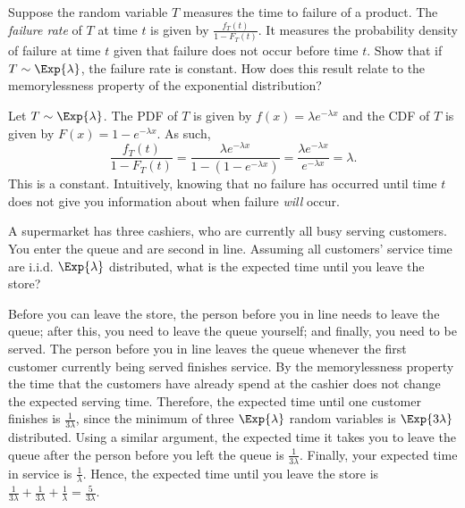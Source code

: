 	\begin{exercise}
		Suppose the random variable $T$ measures the time to failure of a product. The \emph{failure rate} of $T$ at time $t$ is given by $\frac{f_T(t)}{1 - F_T(t)}$. It measures the probability density of failure at time $t$ given that failure does not occur before time $t$. Show that if $T \sim \Exp{\lambda}$, the failure rate is constant. How does this result relate to the memorylessness property of the exponential distribution?
		\begin{solution}
			Let $T \sim \Exp{\lambda}$. The PDF of $T$ is given by $f(x) = \lambda e^{- \lambda x}$ and the CDF of $T$ is given by $F(x) = 1 - e^{- \lambda x}$. As such,
			\begin{equation*}
				\frac{f_T(t)}{1 - F_T(t)} = \frac{\lambda e^{- \lambda x}}{1 - (1 - e^{- \lambda x})} = \frac{\lambda e^{- \lambda x}}{e^{- \lambda x}} = \lambda.
			\end{equation*}
			This is a constant. Intuitively, knowing that no failure has occurred until time $t$ does not give you information about when failure \emph{will} occur.
		\end{solution}
	\end{exercise}
	
	\begin{exercise}
		A supermarket has three cashiers, who are currently all busy serving customers. You enter the queue and are second in line. Assuming all customers' service time are i.i.d. $\Exp{\lambda}$ distributed, what is the expected time until you leave the store?
		\begin{solution}
			Before you can leave the store, the person before you in line needs to leave the queue; after this, you need to leave the queue yourself; and finally, you need to be served. The person before you in line leaves the queue whenever the first customer currently being served finishes service. By the memorylessness property the time that the customers have already spend at the cashier does not change the expected serving time. Therefore, the expected time until one customer finishes is $\frac{1}{3 \lambda}$, since the minimum of three $\Exp{\lambda}$ random variables is $\Exp{3 \lambda}$ distributed. Using a similar argument, the expected time it takes you to leave the queue after the person before you left the queue is $\frac{1}{3 \lambda}$. Finally, your expected time in service is $\frac{1}{\lambda}$. Hence, the expected time until you leave the store is $\frac{1}{3 \lambda} + \frac{1}{3 \lambda} + \frac{1}{\lambda} = \frac{5}{3 \lambda}$.
		\end{solution}
	\end{exercise}

